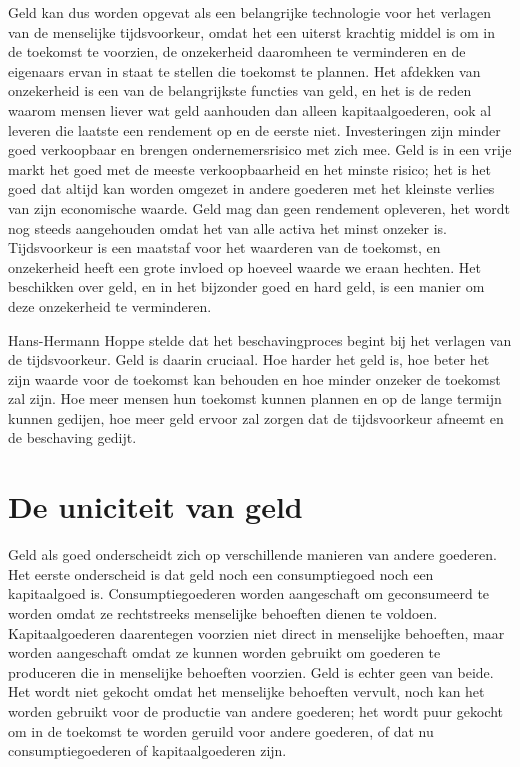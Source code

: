 Geld kan dus worden opgevat als een belangrijke technologie voor het verlagen van de menselijke tijdsvoorkeur, omdat het een uiterst krachtig middel is om in de toekomst te voorzien, de onzekerheid daaromheen te verminderen en de eigenaars ervan in staat te stellen die toekomst te plannen. Het afdekken van onzekerheid is een van de belangrijkste functies van geld, en het is de reden waarom mensen liever wat geld aanhouden dan alleen kapitaalgoederen, ook al leveren die laatste een rendement op en de eerste niet.\autocite{117} Investeringen zijn minder goed verkoopbaar en brengen ondernemersrisico met zich mee. Geld is in een vrije markt het goed met de meeste verkoopbaarheid en het minste risico; het is het goed dat altijd kan worden omgezet in andere goederen met het kleinste verlies van zijn economische waarde. Geld mag dan geen rendement opleveren, het wordt nog steeds aangehouden omdat het van alle activa het minst onzeker is.\autocite{118} Tijdsvoorkeur is een maatstaf voor het waarderen van de toekomst, en onzekerheid heeft een grote invloed op hoeveel waarde we eraan hechten. Het beschikken over geld, en in het bijzonder goed en hard geld, is een manier om deze onzekerheid te verminderen.


Hans-Hermann Hoppe stelde dat het beschavingproces begint bij het verlagen van de tijdsvoorkeur.\autocite{119} Geld is daarin cruciaal. Hoe harder het geld is, hoe beter het zijn waarde voor de toekomst kan behouden en hoe minder onzeker de toekomst zal zijn. Hoe meer mensen hun toekomst kunnen plannen en op de lange termijn kunnen gedijen, hoe meer geld ervoor zal zorgen dat de tijdsvoorkeur afneemt en de beschaving gedijt.
\hypertarget{de-uniekheid-van-geld}{%
\section{De uniciteit van geld}\label{de-uniekheid-van-geld}}

Geld als goed onderscheidt zich op verschillende manieren van andere goederen. Het eerste onderscheid is dat geld noch een consumptiegoed noch een kapitaalgoed is. Consumptiegoederen worden aangeschaft om geconsumeerd te worden omdat ze rechtstreeks menselijke behoeften dienen te voldoen. Kapitaalgoederen daarentegen voorzien niet direct in menselijke behoeften, maar worden aangeschaft omdat ze kunnen worden gebruikt om goederen te produceren die in menselijke behoeften voorzien. Geld is echter geen van beide. Het wordt niet gekocht omdat het menselijke behoeften vervult, noch kan het worden gebruikt voor de productie van andere goederen; het wordt puur gekocht om in de toekomst te worden geruild voor andere goederen, of dat nu consumptiegoederen of kapitaalgoederen zijn.

